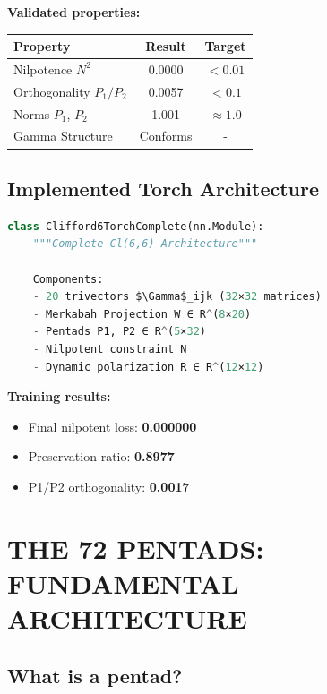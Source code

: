 \documentclass[11pt]{article}
\providecommand{\cmark}{\ding{51}}
\providecommand{\wmark}{\ding{73}}
\newcommand{\symSucces}{\textcolor{success}{\cmark}}
\newcommand{\symAttention}{\textcolor{warning}{\wmark}}
\providecommand{\tightlist}{%
\setlength{\itemsep}{2pt}\setlength{\parskip}{6pt}
}
\begin{document}
\textbf{Validated properties:}

\begin{longtable}{@{}lcc@{}}
\toprule
\textbf{Property} & \textbf{Result} & \textbf{Target} \\
\midrule
Nilpotence $N^2$ & 0.0000 & $< 0.01$ \\
Orthogonality $P_1/P_2$ & 0.0057 & $< 0.1$ \\
Norms $P_1$, $P_2$ & 1.001 & $\approx 1.0$ \\
Gamma Structure & Conforms & - \\
\bottomrule
\end{longtable}

\hypertarget{implemented-torch-architecture}{%
\subsection{Implemented Torch
Architecture}\label{implemented-torch-architecture}}

\begin{lstlisting}[language=Python]
class Clifford6TorchComplete(nn.Module):
    """Complete Cl(6,6) Architecture"""

    Components:
    - 20 trivectors $\Gamma$_ijk (32×32 matrices)
    - Merkabah Projection W ∈ R^(8×20)
    - Pentads P1, P2 ∈ R^(5×32)
    - Nilpotent constraint N
    - Dynamic polarization R ∈ R^(12×12)
\end{lstlisting}

\textbf{Training results:}

\begin{itemize}
\tightlist
\item
  Final nilpotent loss: \textbf{0.000000} \symSucces
\item
  Preservation ratio: \textbf{0.8977} \symAttention
\item
  P1/P2 orthogonality: \textbf{0.0017} \symSucces
\end{itemize}

\hypertarget{the-72-pentads-fundamental-architecture}{%
\section{THE 72 PENTADS: FUNDAMENTAL
ARCHITECTURE}\label{the-72-pentads-fundamental-architecture}}

\hypertarget{what-is-a-pentad}{%
\subsection{What is a pentad?}\label{what-is-a-pentad}}
\end{document}
